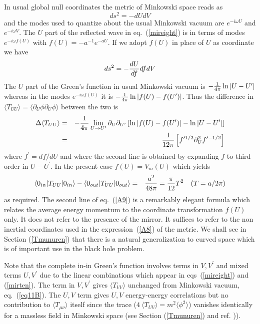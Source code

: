\documentclass[12pt,oneside]{report}
\def\p {\prime}
\begin{document}
 In usual global null coordinates the metric of Minkowski 
space reads as
\begin{equation}
ds^2 =- dUdV
\label{A7}
\end{equation}
and the modes  used to quantize about the usual Minkowski vacuum are
 $e^{-i \omega U}$ and $e^{-i \omega V}$. The
$U$ part of the reflected wave in eq.~(\ref{mireight}) is in terms
of modes $e^{-i\omega f(U)}$ with $f(U) = -a^{-1} e^{-aU}$.
If we adopt $f(U)$ in place of $U$ as coordinate we have
\begin{equation} ds^2 =- {dU\over df} dfdV
\label{A8}
\end{equation}
The $U$ part of the Green's function in usual Minkowski
vacuum is $-{1 \over 4 \pi}\ln \vert U - U^\prime\vert$
whereas in the modes $e^{-i\omega f(U)}$ it is 
$-{1 \over 4 \pi}\ln \vert f(U) - f(U^\prime ) \vert$.
Thus the difference in $\langle T_{UU} \rangle = 
\langle \partial_U \phi  \partial_U \phi \rangle$ between
the two is
\begin{eqnarray}
\Delta \langle T_{UU} \rangle &=&
-{1 \over 4\pi} \lim_{U \to U^\prime}
\partial_U\partial_{U^\prime} \left[
\ln \vert f(U) - f(U^\prime ) \vert
-
\ln \vert U - U^\prime  \vert\right]\nonumber\\
&=& {1 \over 12 \pi}
\left[ f^{\prime 1/2}\partial_U^2 f^{\prime -1/2}
\right]\label{A9}
\end{eqnarray}
where $f^{\prime} = df/dU$ and where
the second line is obtained by expanding $f$ to third order in $U-U^\p$. 
In the present case $f(U) = V_m(U)$ which yields
\begin{eqnarray}
\langle 0_{in} \vert T_{UU} \vert 0_{in} \rangle -
\langle 0_{out} \vert T_{UU} \vert 0_{out} \rangle
&=&{a^2 \over 48 \pi} = {\pi \over 12 }T^2\quad (T= a/ 2
\pi) \label{A9B}
\end{eqnarray}
as required. The second line of eq.~(\ref{A9})
is a remarkably elegant formula which relates the
average energy momentum  to the coordinate transformation
$f(U)$ only. It does not refer to the presence of the
mirror. It suffices to refer to the non inertial coordinates used in the
expression~(\ref{A8}) of the metric. We shall see in Section (\ref{Tmunuren})
that there is a natural generalization to curved space which is of
important use in the black hole problem. 

Note that the complete in-in Green's
function involves terms in $V,V^\prime$ and mixed terms
$U,V^\prime$ due to the linear combinations which appear in eqs~(\ref{mireight})
and (\ref{mirten}). The term in $V,V^\prime$ gives $\langle T_{VV} \rangle$
unchanged from Minkowski vacuum, eq.~(\ref{eq11B}). The $U,V$ term gives $U,V$
energy-energy  correlations
but no contribution to $\langle T_{\mu\nu} \rangle$ itself
since the trace ($4\ \langle T_{UV} \rangle = m^2 \langle \phi^2 \rangle $)
vanishes identically for a massless field in Minkowski space
(see Section (\ref{Tmunuren}) and ref. \cite{BD})).
\end{document}
